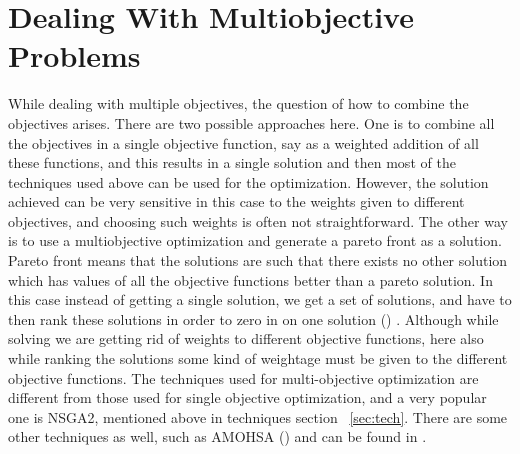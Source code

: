 \section{Dealing With Multiobjective Problems}
While dealing with multiple objectives, the question of how to combine the objectives arises. There are two possible approaches here. One is to combine all the objectives in a single objective function, say as a weighted addition of all these functions, and this results in a single solution and then most of the techniques used above can be used for the optimization. However, the solution achieved can be very sensitive in this case to the weights given to different objectives, and choosing such weights is often not straightforward. The other way is to use a multiobjective optimization and generate a pareto front as a solution. Pareto front means that the solutions are such that there exists no other solution which has values of all the objective functions better than a pareto solution. In this case instead of getting a single solution, we get a set of solutions, and have to then rank these solutions in order to zero in on one solution (\citep{mgrj52}) . Although while solving we are getting rid of weights to different objective functions, here also while ranking the solutions some kind of weightage must be given to the different objective functions. The techniques used for multi-objective optimization are different from those used for single objective optimization, and a very popular one is NSGA2, mentioned above in techniques section ~\ref{sec:tech}. There are some other techniques as well, such as AMOHSA (\citep{mgrj14}) and can be found in \citep{mgrj42}.



